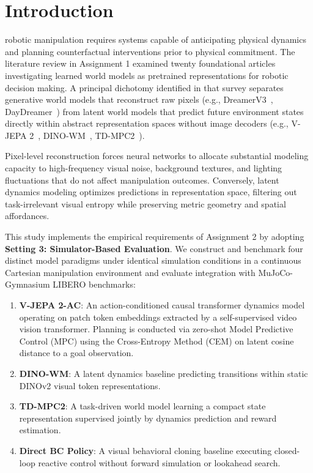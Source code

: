 \documentclass[10pt,journal,compsoc]{IEEEtran}
\begin{document}
\section{Introduction}

 robotic manipulation requires systems capable of anticipating physical dynamics and planning counterfactual interventions prior to physical commitment. The literature review in Assignment 1 examined twenty foundational articles investigating learned world models as pretrained representations for robotic decision making. A principal dichotomy identified in that survey separates generative world models that reconstruct raw pixels (e.g., DreamerV3~\cite{hafner2025dreamerv3}, DayDreamer~\cite{wu2022daydreamer}) from latent world models that predict future environment states directly within abstract representation spaces without image decoders (e.g., V-JEPA 2~\cite{assran2025vjepa2}, DINO-WM~\cite{zhou2025dinowm}, TD-MPC2~\cite{hansen2024tdmpc2}).

Pixel-level reconstruction forces neural networks to allocate substantial modeling capacity to high-frequency visual noise, background textures, and lighting fluctuations that do not affect manipulation outcomes. Conversely, latent dynamics modeling optimizes predictions in representation space, filtering out task-irrelevant visual entropy while preserving metric geometry and spatial affordances.

This study implements the empirical requirements of Assignment 2 by adopting \textbf{Setting 3: Simulator-Based Evaluation}. We construct and benchmark four distinct model paradigms under identical simulation conditions in a continuous Cartesian manipulation environment and evaluate integration with MuJoCo-Gymnasium LIBERO benchmarks:
\begin{enumerate}
    \item \textbf{V-JEPA 2-AC}: An action-conditioned causal transformer dynamics model operating on patch token embeddings extracted by a self-supervised video vision transformer. Planning is conducted via zero-shot Model Predictive Control (MPC) using the Cross-Entropy Method (CEM) on latent cosine distance to a goal observation.
    \item \textbf{DINO-WM}: A latent dynamics baseline predicting transitions within static DINOv2 visual token representations.
    \item \textbf{TD-MPC2}: A task-driven world model learning a compact state representation supervised jointly by dynamics prediction and reward estimation.
    \item \textbf{Direct BC Policy}: A visual behavioral cloning baseline executing closed-loop reactive control without forward simulation or lookahead search.
\end{enumerate}
\end{document}
